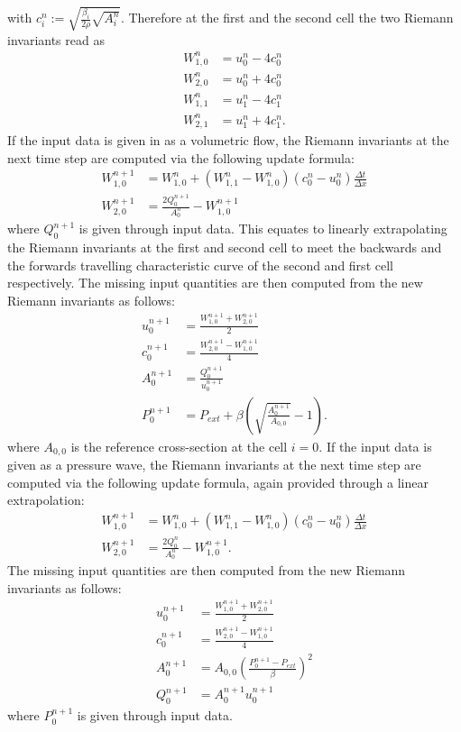 \documentclass[a4paper, oneside]{discothesis}
\begin{document}
	with $c^n_i := \sqrt{\frac{\beta_i}{2\rho}\sqrt{A_i^n}}$.
	Therefore at the first and the second cell the two Riemann invariants read as
	\begin{align}
		W_{1,0}^n &= u^n_0 - 4c^n_0\\
		W_{2,0}^n &= u^n_0 + 4c^n_0\\
		W_{1,1}^n &= u^n_1 - 4c^n_1\\
		W_{2,1}^n &= u^n_1 + 4c^n_1.
	\end{align}
	If the input data is given in as a volumetric flow, the Riemann invariants at the next time step are computed via the following update formula:
	\begin{align}
		W_{1,0}^{n+1} &= W^n_{1,0} + (W^n_{1,1} - W^n_{1,0})(c^n_0-u^n_0) \frac{\Delta t}{\Delta x} \label{update1a}\\
		W_{2,0}^{n+1} &= \frac{2Q^{n+1}_0}{A^n_0} - W^{n+1}_{1,0} \label{update2a}
	\end{align}
	where $Q^{n+1}_0$ is given through input data.
	This equates to linearly extrapolating the Riemann invariants at the first and second cell to meet the backwards and the forwards travelling characteristic curve of the second and first cell respectively.
	The missing input quantities are then computed from the new Riemann invariants as follows:
	\begin{align}
		u_0^{n+1} &= \frac{W_{1,0}^{n+1} + W_{2,0}^{n+1}}{2} \\
		c_0^{n+1} &= \frac{W_{2,0}^{n+1} - W_{1,0}^{n+1}}{4} \\
		A_0^{n+1} &= \frac{Q_0^{n+1}}{u_0^{n+1}} \\
		P_0^{n+1} &= P_{ext} + \beta \left( \sqrt{\frac{A_0^{n+1}}{A_{0,0}}} - 1 \right). 
	\end{align}
	where $A_{0,0}$ is the reference cross-section at the cell $i=0$.
	If the input data is given as a pressure wave, the Riemann invariants at the next time step are computed via the following update formula, again provided through a linear extrapolation:
	\begin{align}
		W_{1,0}^{n+1} &= W^n_{1,0} + (W^n_{1,1} - W^n_{1,0})(c^n_0-u^n_0) \frac{\Delta t}{\Delta x} \label{update1b}\\
		W_{2,0}^{n+1} &= \frac{2Q^{n}_0}{A^n_0} - W^{n+1}_{1,0} \label{update2b}.
	\end{align}
	The missing input quantities are then computed from the new Riemann invariants as follows:
	\begin{align}
		u_0^{n+1} &= \frac{W_{1,0}^{n+1} + W_{2,0}^{n+1}}{2} \\
		c_0^{n+1} &= \frac{W_{2,0}^{n+1} - W_{1,0}^{n+1}}{4} \\
		A_0^{n+1} &= A_{0,0}\left(\frac{P_0^{n+1}-P_{ext}}{\beta}\right)^2\\
		Q_0^{n+1} &= A_0^{n+1} u_0^{n+1}
	\end{align}
	where $P^{n+1}_0$ is given through input data.
\end{document}
